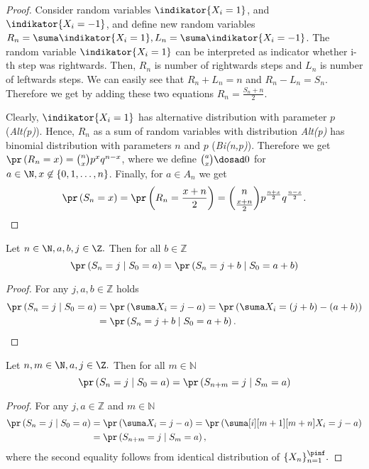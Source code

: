 \begin{proof}
  Consider random variables $\indikator{X_i=1}$, and
  $\indikator{X_i=-1}$, and define new random variables
  $R_n=\suma \indikator{X_i=1}, L_n=\suma \indikator{X_i=-1}$.  The
  random variable $\indikator{X_i=1}$ can be interpreted as indicator
  whether i-th step was rightwards. Then, $R_n$ is number of
  rightwards steps and $L_n$ is number of leftwards steps. We can
  easily see that $R_n+L_n=n$ and $R_n-L_n=S_n$.  Therefore we get by
  adding these two equations $R_n=\frac{S_n+n}{2}.$

  Clearly, $\indikator{X_i=1}$ has alternative distribution with
  parameter $p$ (\textit{Alt(p)}). Hence, $R_n$ as a sum of \iid
  random variables with distribution \textit{Alt(p)} has binomial
  distribution with parameters $n$ and $p$ (\textit{Bi(n,p)}).
  Therefore we get
  $\pr \left(R_n=x \right) =\binom{n}{x}p^{x}q^{n-x}$, where we define
  $\binom{a}{x}\dosad 0$ for $a \in \N, x\not\in \{0,1,\dots,n\}$.
  Finally, for $a \in A_n$ we get
  \[
    \pr \left( S_n=x \right) =\pr\left( R_n=\frac{x+n}{2} \right) =
    \binom{n}{\frac{x+n}{2}}p^{\frac{n+x}{2}}q^{\frac{n-x}{2}}.
  \]
\end{proof}
\begin{lemma}\label{lemma-spatial_homogeneity}
  Let $n \in \N, a,b,j \in \Z.$ Then for all $b \in \mathbb Z$
  \[
    \pr \left( S_n=j \mid S_0=a \right) =\pr \left( S_n=j+b \mid
      S_0=a+b \right)
  \]
\end{lemma}

\begin{proof} For any $j, a, b \in \mathbb Z$ holds
  \[
    \begin{split}
      \pr \left( S_n=j \mid S_0=a \right) & =\pr \left( \suma X_i=j-a
      \right)
      =\pr \left( \suma X_i= \left( j+b \right) - \left( a+b \right) \right) \\
      & =\pr \left( S_n=j+b \mid S_0=a+b \right).
    \end{split}
 \]
\end{proof}


\begin{lemma}\label{lemma-temporal_homogeneity}
  Let $n,m \in \N, a,j \in \Z.$ Then for all $m \in \mathbb N$
  \[
    \pr \left( S_n=j \mid S_0=a \right) =\pr \left( S_{n+m}=j \mid
      S_m=a \right)
  \]
\end{lemma}
\begin{proof} For any $j, a \in \mathbb Z$ and $m \in \mathbb N$
  \[
    \begin{split}
      \pr \left( S_n=j \mid S_0=a \right) & =\pr \left( \suma X_i=j-a
      \right)
      =\pr \left( \suma[i][m+1][m+n]X_i=j-a \right)\\
      & =\pr \left( S_{n+m}=j \mid S_m=a \right),
    \end{split}
  \]
where the second equality follows from identical distribution of
$\{X_n\}_{n=1}^{\pinf}.$
\end{proof}

